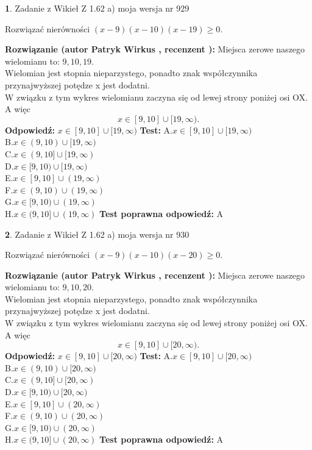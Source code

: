 \documentclass[12pt, a4paper]{article}
\theoremstyle{definition} %
\newtheorem{zad}{}
\newcommand{\zadStart}[1]{\begin{zad}#1\newline}
\newcommand{\zadStop}{\end{zad}}
\newcommand{\rozwStart}[2]{\noindent \textbf{Rozwiązanie (autor #1 , recenzent #2): }\newline}
\newcommand{\rozwStop}{\newline}
\newcommand{\odpStart}{\noindent \textbf{Odpowiedź:}\newline}
\newcommand{\odpStop}{\newline}
\newcommand{\testStart}{\noindent \textbf{Test:}\newline}
\newcommand{\testStop}{\newline}
\newcommand{\kluczStart}{\noindent \textbf{Test poprawna odpowiedź:}\newline}
\newcommand{\kluczStop}{\newline}
\begin{document}
\zadStart{Zadanie z Wikieł Z 1.62 a) moja wersja nr 929}

Rozwiązać nierówności $(x-9)(x-10)(x-19)\ge0$.
\zadStop
\rozwStart{Patryk Wirkus}{}
Miejsca zerowe naszego wielomianu to: $9, 10, 19$.\\
Wielomian jest stopnia nieparzystego, ponadto znak współczynnika przy\linebreak najwyższej potędze x jest dodatni.\\ W związku z tym wykres wielomianu zaczyna się od lewej strony poniżej osi OX. A więc $$x \in [9,10] \cup [19,\infty).$$
\rozwStop
\odpStart
$x \in [9,10] \cup [19,\infty)$
\odpStop
\testStart
A.$x \in [9,10] \cup [19,\infty)$\\
B.$x \in (9,10) \cup [19,\infty)$\\
C.$x \in (9,10] \cup [19,\infty)$\\
D.$x \in [9,10) \cup [19,\infty)$\\
E.$x \in [9,10] \cup (19,\infty)$\\
F.$x \in (9,10) \cup (19,\infty)$\\
G.$x \in [9,10) \cup (19,\infty)$\\
H.$x \in (9,10] \cup (19,\infty)$
\testStop
\kluczStart
A
\kluczStop



\zadStart{Zadanie z Wikieł Z 1.62 a) moja wersja nr 930}

Rozwiązać nierówności $(x-9)(x-10)(x-20)\ge0$.
\zadStop
\rozwStart{Patryk Wirkus}{}
Miejsca zerowe naszego wielomianu to: $9, 10, 20$.\\
Wielomian jest stopnia nieparzystego, ponadto znak współczynnika przy\linebreak najwyższej potędze x jest dodatni.\\ W związku z tym wykres wielomianu zaczyna się od lewej strony poniżej osi OX. A więc $$x \in [9,10] \cup [20,\infty).$$
\rozwStop
\odpStart
$x \in [9,10] \cup [20,\infty)$
\odpStop
\testStart
A.$x \in [9,10] \cup [20,\infty)$\\
B.$x \in (9,10) \cup [20,\infty)$\\
C.$x \in (9,10] \cup [20,\infty)$\\
D.$x \in [9,10) \cup [20,\infty)$\\
E.$x \in [9,10] \cup (20,\infty)$\\
F.$x \in (9,10) \cup (20,\infty)$\\
G.$x \in [9,10) \cup (20,\infty)$\\
H.$x \in (9,10] \cup (20,\infty)$
\testStop
\kluczStart
A
\kluczStop
\end{document}

